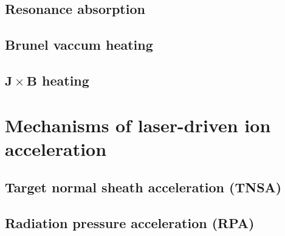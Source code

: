 \documentclass[12pt, twoside, a4paper, openright]{report}
\renewcommand{\vec}[1]{\mathbf{#1}}
\begin{document}
\subsection{Resonance absorption}


\subsection{Brunel vaccum heating}
%

\subsection{$ \vec{J} \times \vec{B} $ heating}
%

\section{Mechanisms of laser-driven ion acceleration}
%

\subsection{Target normal sheath acceleration (TNSA)}
%

\subsection{Radiation pressure acceleration (RPA)}
%

%

%

%

%
\end{document}
